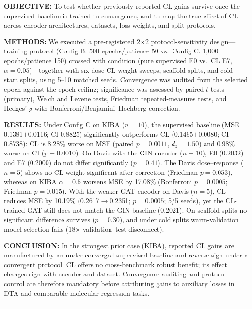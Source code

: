 \documentclass[10pt,a4paper,twocolumn]{article}
\begin{document}
\noindent\textbf{OBJECTIVE:} To test whether previously reported CL gains survive once the supervised baseline is trained to convergence, and to map the true effect of CL across encoder architectures, datasets, loss weights, and split protocols.

\noindent\textbf{METHODS:} We executed a pre-registered 2$\times$2 protocol-sensitivity design---training protocol (Config B: 500 epochs/patience 50 vs.\ Config C: 1{,}000 epochs/patience 150) crossed with condition (pure supervised E0 vs.\ CL E7, $\alpha=0.05$)---together with six-dose CL weight sweeps, scaffold splits, and cold-start splits, using 5--10 matched seeds. Convergence was audited from the selected epoch against the epoch ceiling; significance was assessed by paired $t$-tests (primary), Welch and Levene tests, Friedman repeated-measures tests, and Hedges' $g$ with Bonferroni/Benjamini--Hochberg correction.

\noindent\textbf{RESULTS:} Under Config C on KIBA ($n=10$), the supervised baseline (MSE 0.1381$\pm$0.0116; CI 0.8825) significantly outperforms CL (0.1495$\pm$0.0080; CI 0.8738): CL is 8.28\% worse on MSE (paired $p=0.0011$, $d_z=1.50$) and 0.98\% worse on CI ($p=0.0010$). On Davis with the GIN encoder ($n=10$), E0 (0.2032) and E7 (0.2000) do not differ significantly ($p=0.41$). The Davis dose--response ($n=5$) shows no CL weight significant after correction (Friedman $p=0.053$), whereas on KIBA $\alpha=0.5$ worsens MSE by 17.08\% (Bonferroni $p=0.0005$; Friedman $p=0.015$). With the weaker GAT encoder on Davis ($n=5$), CL reduces MSE by 10.19\% (0.2617$\to$0.2351; $p=0.0005$; 5/5 seeds), yet the CL-trained GAT still does not match the GIN baseline (0.2021). On scaffold splits no significant difference survives ($p=0.30$), and under cold splits warm-validation model selection fails (18$\times$ validation--test disconnect).

\noindent\textbf{CONCLUSION:} In the strongest prior case (KIBA), reported CL gains are manufactured by an under-converged supervised baseline and reverse sign under a convergent protocol. CL offers no cross-benchmark robust benefit; its effect changes sign with encoder and dataset. Convergence auditing and protocol control are therefore mandatory before attributing gains to auxiliary losses in DTA and comparable molecular regression tasks.

\noindent\rule{\linewidth}{1pt}

\end{document}
